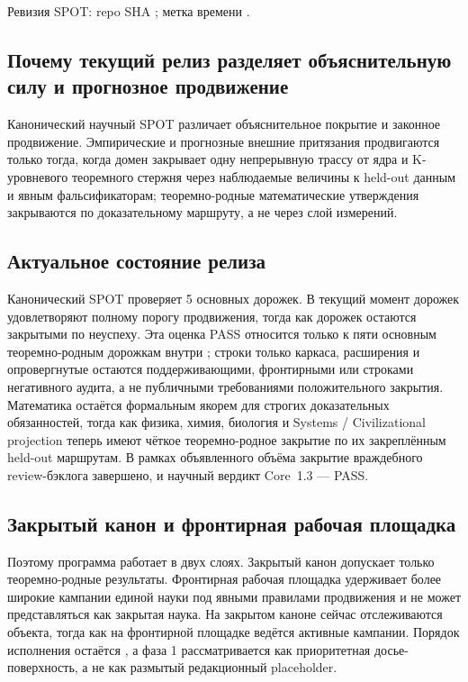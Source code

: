 Ревизия SPOT: repo SHA ; метка времени .

\subsection{Почему текущий релиз разделяет объяснительную силу и прогнозное продвижение}
Канонический научный SPOT различает объяснительное покрытие и законное продвижение. Эмпирические и прогнозные внешние притязания продвигаются только тогда, когда домен закрывает одну непрерывную трассу от ядра и K-уровневого теоремного стержня через наблюдаемые величины к held-out данным и явным фальсификаторам; теоремно-родные математические утверждения закрываются по доказательному маршруту, а не через слой измерений.

\subsection{Актуальное состояние релиза}
Канонический SPOT проверяет 5 основных дорожек. В текущий момент  дорожек удовлетворяют полному порогу продвижения, тогда как  дорожек остаются закрытыми по неуспеху.
Эта оценка PASS относится только к пяти основным теоремно-родным дорожкам внутри ; строки только каркаса, расширения и опровергнутые остаются поддерживающими, фронтирными или строками негативного аудита, а не публичными требованиями положительного закрытия.
Математика остаётся формальным якорем для строгих доказательных обязанностей, тогда как физика, химия, биология и Systems / Civilizational projection теперь имеют чёткое теоремно-родное закрытие по их закреплённым held-out маршрутам. В рамках объявленного объёма  закрытие враждебного review-бэклога завершено, и научный вердикт Core~1.3 — PASS.

\subsection{Закрытый канон и фронтирная рабочая площадка}
Поэтому программа работает в двух слоях. Закрытый канон допускает только теоремно-родные результаты. Фронтирная рабочая площадка удерживает более широкие кампании единой науки под явными правилами продвижения и не может представляться как закрытая наука.
На закрытом каноне сейчас отслеживаются  объекта, тогда как на фронтирной площадке ведётся  активные кампании.
Порядок исполнения остаётся , а фаза 1 рассматривается как приоритетная досье-поверхность, а не как размытый редакционный placeholder.

